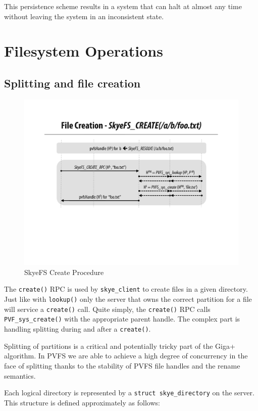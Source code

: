 \documentclass[twocolumn,letterpaper]{article}
\newcommand{\code}[1]{\texttt{#1}}
\begin{document}
This persistence scheme results in a system that can halt at almost any time
without leaving the system in an inconsistent state.

\section{Filesystem Operations}
\subsection{Splitting and file creation}
\begin{figure}
\begin{center}
\includegraphics[scale=0.4]{figure-create}
\end{center}
\caption{SkyeFS Create Procedure}
\end{figure}
The \code{create()} RPC is used by \code{skye\_\-client} to create files in a given
directory.  Just like with \code{lookup()} only the server that owns the correct
partition for a file will service a \code{create()} call.  Quite simply, the
\code{create()} RPC calls \code{PVF\_\-sys\_\-create()} with the appropriate
parent handle.  The complex part is handling splitting during and after a
\code{create()}.

Splitting of partitions is a critical and potentially tricky part of the Giga+
algorithm.  In PVFS we are able to achieve a high degree of concurrency in the
face of splitting thanks to the stability of PVFS file handles and the rename
semantics.

Each logical directory is represented by a \code{struct skye\_\-directory} on
the server.  This structure is defined approximately as follows:
\end{document}
